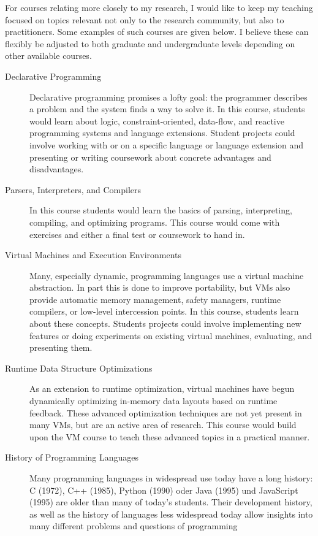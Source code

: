\documentclass[11pt,a4paper,sans]{moderncv} %
\begin{document}
For courses relating more closely to my research, I would like to keep my
teaching focused on topics relevant not only to the research community, but also
to practitioners. Some examples of such courses are given below. I believe these
can flexibly be adjusted to both graduate and undergraduate levels depending on
other available courses.

\begin{description}
\item[Declarative Programming] Declarative programming promises a lofty goal:
  the programmer describes a problem and the system finds a way to solve it. In
  this course, students would learn about logic, constraint-oriented, data-flow,
  and reactive programming systems and language extensions. Student projects
  could involve working with or on a specific language or language extension and
  presenting or writing coursework about concrete advantages and disadvantages.
\item[Parsers, Interpreters, and Compilers] In this course students would learn
  the basics of parsing, interpreting, compiling, and optimizing programs. This
  course would come with exercises and either a final test or coursework to hand
  in.
\item[Virtual Machines and Execution Environments] Many, especially dynamic,
  programming languages use a virtual machine abstraction. In part this is done
  to improve portability, but VMs also provide automatic memory management,
  safety managers, runtime compilers, or low-level intercession points. In this
  course, students learn about these concepts. Students projects could involve
  implementing new features or doing experiments on existing virtual machines,
  evaluating, and presenting them.
\item[Runtime Data Structure Optimizations] As an extension to runtime
  optimization, virtual machines have begun dynamically optimizing in-memory
  data layouts based on runtime feedback. These advanced optimization techniques
  are not yet present in many VMs, but are an active area of research. This
  course would build upon the VM course to teach these advanced topics in a
  practical manner.
\item[History of Programming Languages] Many programming languages in widespread
  use today have a long history: C (1972), C++ (1985), Python (1990) oder Java
  (1995) und JavaScript (1995) are older than many of today's students. Their
  development history, as well as the history of languages less widespread today
  allow insights into many different problems and questions of programming

\end{description}
\end{document}

